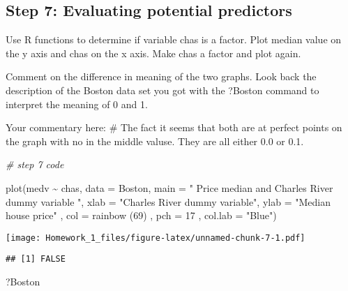 \documentclass[
]{article}
\newenvironment{Shaded}{\begin{snugshade}}{\end{snugshade}}
\newcommand{\AttributeTok}[1]{\textcolor[rgb]{0.77,0.63,0.00}{#1}}
\newcommand{\CommentTok}[1]{\textcolor[rgb]{0.56,0.35,0.01}{\textit{#1}}}
\newcommand{\DecValTok}[1]{\textcolor[rgb]{0.00,0.00,0.81}{#1}}
\newcommand{\FunctionTok}[1]{\textcolor[rgb]{0.00,0.00,0.00}{#1}}
\newcommand{\NormalTok}[1]{#1}
\newcommand{\SpecialCharTok}[1]{\textcolor[rgb]{0.00,0.00,0.00}{#1}}
\newcommand{\StringTok}[1]{\textcolor[rgb]{0.31,0.60,0.02}{#1}}
\begin{document}
\hypertarget{step-7-evaluating-potential-predictors}{%
\subsection{Step 7: Evaluating potential
predictors}\label{step-7-evaluating-potential-predictors}}

Use R functions to determine if variable chas is a factor. Plot median
value on the y axis and chas on the x axis. Make chas a factor and plot
again.

Comment on the difference in meaning of the two graphs. Look back the
description of the Boston data set you got with the ?Boston command to
interpret the meaning of 0 and 1.

Your commentary here: \# The fact it seems that both are at perfect
points on the graph with no in the middle valuse. They are all either
0.0 or 0.1.

\begin{Shaded}
\begin{Highlighting}[]
\CommentTok{\# step 7 code}

\FunctionTok{plot}\NormalTok{(medv }\SpecialCharTok{\textasciitilde{}}\NormalTok{ chas, }\AttributeTok{data =}\NormalTok{ Boston, }\AttributeTok{main =} \StringTok{" Price median and Charles River dummy variable "}\NormalTok{, }\AttributeTok{xlab =} \StringTok{"Charles River dummy variable"}\NormalTok{, }\AttributeTok{ylab =} \StringTok{"Median house price"}\NormalTok{ , }\AttributeTok{col =} \FunctionTok{rainbow}\NormalTok{ (}\DecValTok{69}\NormalTok{) , }\AttributeTok{pch =} \DecValTok{17}\NormalTok{ , }\AttributeTok{col.lab =} \StringTok{"Blue"}\NormalTok{)}
\end{Highlighting}
\end{Shaded}

\texttt{[image: Homework\_1\_files/figure-latex/unnamed-chunk-7-1.pdf]}

\begin{Shaded}
\end{Shaded}

\begin{verbatim}
## [1] FALSE
\end{verbatim}

\begin{Shaded}
\begin{Highlighting}[]
\NormalTok{?Boston }
\end{Highlighting}
\end{Shaded}
\end{document}
